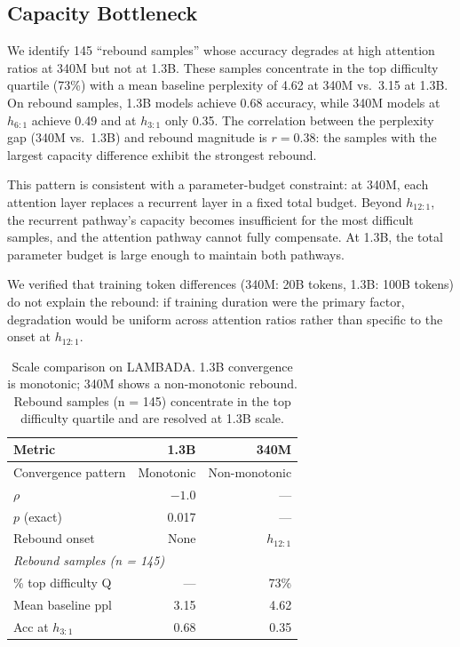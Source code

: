 \documentclass[11pt]{article}
\begin{document}
\subsection{Capacity Bottleneck}

We identify 145 ``rebound samples'' whose accuracy degrades at high attention ratios at 340M but not at 1.3B.
These samples concentrate in the top difficulty quartile (73\%) with a mean baseline perplexity of 4.62 at 340M vs.\ 3.15 at 1.3B.
On rebound samples, 1.3B models achieve 0.68 accuracy, while 340M models at $h_{6:1}$ achieve 0.49 and at $h_{3:1}$ only 0.35.
The correlation between the perplexity gap (340M vs.\ 1.3B) and rebound magnitude is $r = 0.38$: the samples with the largest capacity difference exhibit the strongest rebound.

This pattern is consistent with a parameter-budget constraint: at 340M, each attention layer replaces a recurrent layer in a fixed total budget.
Beyond $h_{12:1}$, the recurrent pathway's capacity becomes insufficient for the most difficult samples, and the attention pathway cannot fully compensate.
At 1.3B, the total parameter budget is large enough to maintain both pathways.

We verified that training token differences (340M: 20B tokens, 1.3B: 100B tokens) do not explain the rebound: if training duration were the primary factor, degradation would be uniform across attention ratios rather than specific to the onset at $h_{12:1}$.

\begin{table}[t]
\centering
\caption{Scale comparison on LAMBADA. 1.3B convergence is monotonic; 340M shows a non-monotonic rebound. Rebound samples (n = 145) concentrate in the top difficulty quartile and are resolved at 1.3B scale.}
\label{tab:scale}
\small
\begin{tabular}{lrr}
\toprule
Metric & 1.3B & 340M \\
\midrule
Convergence pattern & Monotonic & Non-monotonic \\
$\rho$ & ${-}1.0$ & --- \\
$p$ (exact) & 0.017 & --- \\
Rebound onset & None & $h_{12:1}$ \\
\midrule
\multicolumn{3}{l}{\textit{Rebound samples (n = 145)}} \\
\% top difficulty Q & --- & 73\% \\
Mean baseline ppl & 3.15 & 4.62 \\
Acc at $h_{3:1}$ & 0.68 & 0.35 \\
\bottomrule
\end{tabular}
\end{table}
\end{document}
